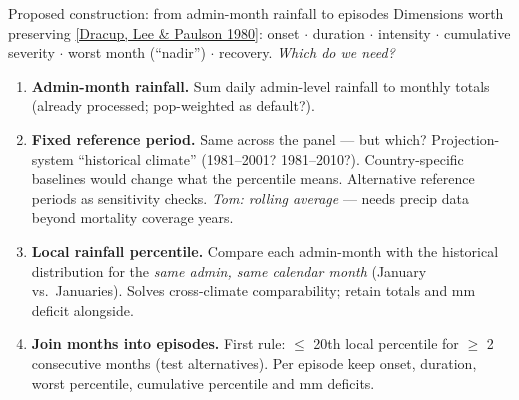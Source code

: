 \documentclass[10pt, aspectratio=169]{beamer}
\newcommand{\paperlink}[2]{\href{#1}{\textcolor{blue!50!black}{\footnotesize [#2]}}}
\begin{document}
\begin{frame}{Proposed construction: from admin-month rainfall to episodes}
  Dimensions worth preserving
  \paperlink{https://doi.org/10.1029/WR016i002p00297}{Dracup, Lee \& Paulson 1980}:
  onset $\cdot$ duration $\cdot$ intensity $\cdot$ cumulative severity $\cdot$
  worst month (``nadir'') $\cdot$ recovery. \emph{Which do we need?}
  \vspace{0.6em}
  \begin{enumerate}
    \item \textbf{Admin-month rainfall.} Sum daily admin-level rainfall to
          monthly totals (already processed; pop-weighted as default?).
    \item \textbf{Fixed reference period.} Same across the panel --- but which?
          Projection-system ``historical climate'' (1981--2001? 1981--2010?).
          Country-specific baselines would change what the percentile means.
          Alternative reference periods as sensitivity checks.
          \emph{Tom: rolling average} --- needs precip data beyond mortality
          coverage years.
    \item \textbf{Local rainfall percentile.} Compare each admin-month with the
          historical distribution for the \emph{same admin, same calendar
          month} (January vs.\ Januaries). Solves cross-climate comparability;
          retain totals and mm deficit alongside.
    \item \textbf{Join months into episodes.} First rule: $\leq$ 20th local
          percentile for $\geq$ 2 consecutive months (test alternatives).
          Per episode keep onset, duration, worst percentile, cumulative
          percentile and mm deficits.
  \end{enumerate}
\end{frame}
\end{document}

